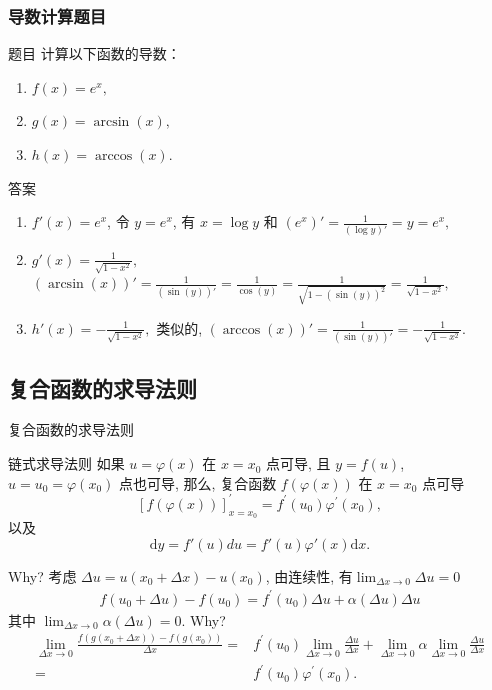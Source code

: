 \documentclass[
10pt,
aspectratio=43,
]{beamer}
\begin{document}
\begin{frame}
	\frametitle{导数计算题目}
	\begin{exampleblock}{题目}
		计算以下函数的导数：
		\begin{enumerate}
			\item $f(x) = e^x,$
			\item $g(x) = \arcsin(x),$
			\item $h(x) = \arccos(x).$
		\end{enumerate}
	\end{exampleblock}

	\pause

	\begin{exampleblock}{答案}
		\begin{enumerate}
			\item $f'(x) = e^x$, 令 $y=e^x$, 有 $x=\log y$ 和 $(e^x)'=\displaystyle\frac{1}{(\log y)'}=y=e^x,$
			\item $g'(x) = \displaystyle\frac{1}{\sqrt{1-x^2}},$ $(\arcsin(x))'=\displaystyle\frac{1}{(\sin (y))'}=\frac{1}{\cos(y)}=\frac{1}{\sqrt{1-(\sin(y))^2}}=\frac{1}{\sqrt{1-x^2}},$
			\item $h'(x) = -\displaystyle\frac{1}{\sqrt{1-x^2}},$ 类似的, $(\arccos(x))'=\displaystyle\frac{1}{(\sin (y))'}=-\frac{1}{\sqrt{1-x^2}}.$
		\end{enumerate}
	\end{exampleblock}
\end{frame}


\subsection{复合函数的求导法则}
\begin{frame}{复合函数的求导法则}
	\begin{block}{链式求导法则}
		如果 $u=\varphi(x)$ 在 $x=x_0$ 点可导, 且 $y=f(u)$, $u=u_0=\varphi\left(x_0\right)$ 点也可导, 那么, 复合函数 $f(\varphi(x))$ 在 $x=x_0$ 点可导
		\[
			[f(\varphi(x))]_{x=x_0}^{\prime}=f^{\prime}\left(u_0\right) \varphi^{\prime}\left(x_0\right),
		\]
		以及
		\[
			\mathrm{d}y=f'(u)du=f'(u)\varphi'(x)\mathrm{d}x.
		\]
	\end{block}
	Why? \pause 考虑 $\Delta u = u(x_0+\Delta x) - u(x_0)$, \pause 由连续性, 有$\lim_{\Delta x\to0}\Delta u=0$ \pause
	\begin{align*}
		f\left(u_0+\Delta u\right)-f\left(u_0\right)=f^{\prime}\left(u_0\right) \Delta u+\alpha(\Delta u) \Delta u
	\end{align*}
	其中 $\lim_{\Delta x\to0}\alpha(\Delta u)=0$. \pause Why? \pause
	\begin{align*}
		\lim _{\Delta x \rightarrow 0} \frac{f\left(g\left(x_0+\Delta x\right)\right)-f\left(g\left(x_0\right)\right)}{\Delta x}= & f^{\prime}\left(u_0\right) \lim _{\Delta x \rightarrow 0} \frac{\Delta u}{\Delta x}+\lim _{\Delta x \rightarrow 0} \alpha \lim _{\Delta x \rightarrow 0} \frac{\Delta u}{\Delta x} \\
		=                                                                                                                         & f^{\prime}\left(u_0\right)\varphi^{\prime}\left(x_0\right).
	\end{align*}
\end{frame}
\end{document}
